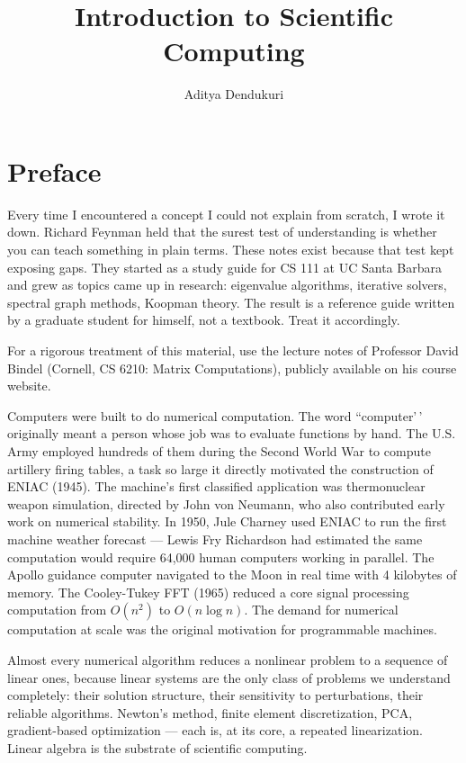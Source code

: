 \documentclass[
  letterpaper,
]{scrbook}
\title{Introduction to Scientific Computing}
\author{Aditya Dendukuri}
\date{}
\renewcommand*\contentsname{Table of contents}
\newcommand\contentsname{Table of contents}
\begin{document}
\frontmatter
\maketitle

\renewcommand*\contentsname{Table of contents}
{
\setcounter{tocdepth}{2}
\tableofcontents
}

\mainmatter
{}

\chapter{Preface}\label{preface}

Every time I encountered a concept I could not explain from scratch, I
wrote it down. Richard Feynman held that the surest test of
understanding is whether you can teach something in plain terms. These
notes exist because that test kept exposing gaps. They started as a
study guide for CS 111 at UC Santa Barbara and grew as topics came up in
research: eigenvalue algorithms, iterative solvers, spectral graph
methods, Koopman theory. The result is a reference guide written by a
graduate student for himself, not a textbook. Treat it accordingly.

For a rigorous treatment of this material, use the lecture notes of
Professor David Bindel (Cornell, CS 6210: Matrix Computations), publicly
available on his course website.

Computers were built to do numerical computation. The word
``computer'\,' originally meant a person whose job was to evaluate
functions by hand. The U.S. Army employed hundreds of them during the
Second World War to compute artillery firing tables, a task so large it
directly motivated the construction of ENIAC (1945). The machine's first
classified application was thermonuclear weapon simulation, directed by
John von Neumann, who also contributed early work on numerical
stability. In 1950, Jule Charney used ENIAC to run the first machine
weather forecast --- Lewis Fry Richardson had estimated the same
computation would require 64,000 human computers working in parallel.
The Apollo guidance computer navigated to the Moon in real time with 4
kilobytes of memory. The Cooley-Tukey FFT (1965) reduced a core signal
processing computation from \(O(n^2)\) to \(O(n \log n)\). The demand
for numerical computation at scale was the original motivation for
programmable machines.

Almost every numerical algorithm reduces a nonlinear problem to a
sequence of linear ones, because linear systems are the only class of
problems we understand completely: their solution structure, their
sensitivity to perturbations, their reliable algorithms. Newton's
method, finite element discretization, PCA, gradient-based optimization
--- each is, at its core, a repeated linearization. Linear algebra is
the substrate of scientific computing.
\end{document}
